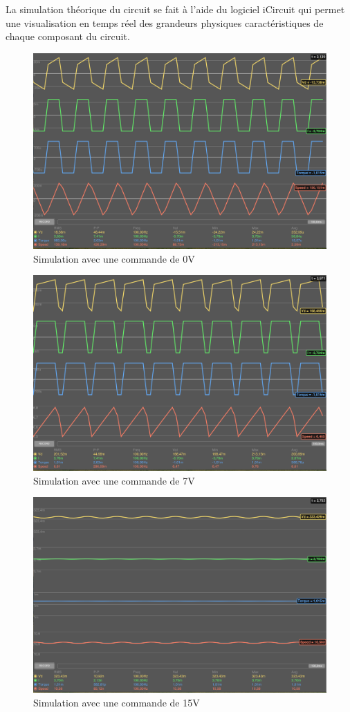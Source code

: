 \documentclass[a4paper]{article}
\begin{document}
La simulation théorique du circuit se fait à l'aide du logiciel iCircuit qui permet une visualisation en temps réel des grandeurs physiques caractéristiques de chaque composant du circuit.
\begin{figure}
	\centering
	\includegraphics[width=1\textwidth]{simu0v}
	\caption{Simulation avec une commande de 0V}
\end{figure}
\begin{figure}
	\centering
	\includegraphics[width=1\textwidth]{simu7v}
	\caption{Simulation avec une commande de 7V}
\end{figure}
\begin{figure}
	\centering
	\includegraphics[width=1\textwidth]{simu15v}
	\caption{Simulation avec une commande de 15V}
\end{figure}
\end{document}
